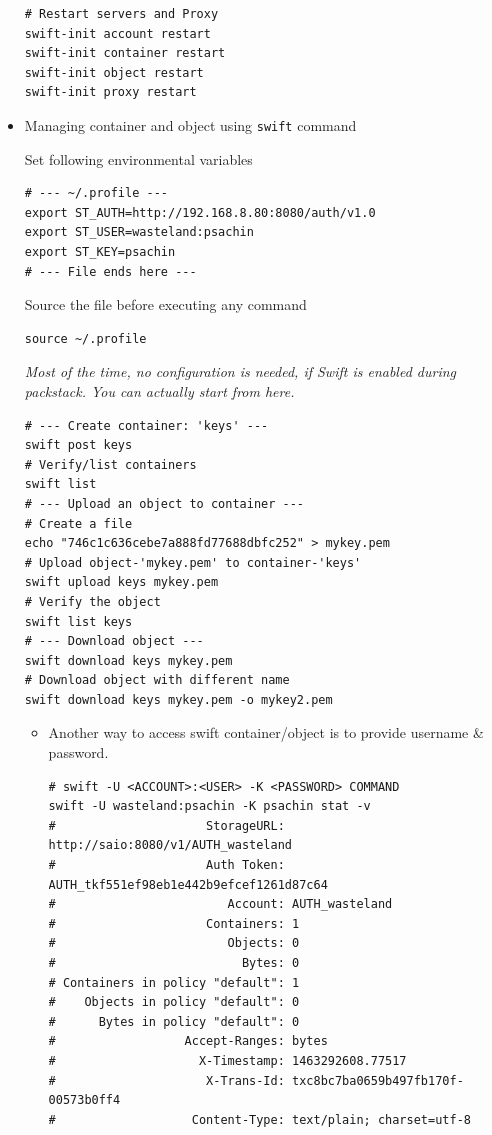 \documentclass{article}
\begin{document}
\begin{itemize}
\begin{verbatim}
# Restart servers and Proxy
swift-init account restart
swift-init container restart
swift-init object restart
swift-init proxy restart
\end{verbatim}
\item Managing container and object using \texttt{swift} command

Set following environmental variables
\begin{verbatim}
# --- ~/.profile ---
export ST_AUTH=http://192.168.8.80:8080/auth/v1.0
export ST_USER=wasteland:psachin
export ST_KEY=psachin
# --- File ends here ---
\end{verbatim}

Source the file before executing any command
\begin{verbatim}
source ~/.profile
\end{verbatim}

\emph{Most of the time, no configuration is needed, if Swift is
enabled during packstack. You can actually start from here.}
\begin{verbatim}
# --- Create container: 'keys' ---
swift post keys
# Verify/list containers
swift list
# --- Upload an object to container ---
# Create a file
echo "746c1c636cebe7a888fd77688dbfc252" > mykey.pem
# Upload object-'mykey.pem' to container-'keys'
swift upload keys mykey.pem
# Verify the object
swift list keys
# --- Download object ---
swift download keys mykey.pem
# Download object with different name
swift download keys mykey.pem -o mykey2.pem
\end{verbatim}

\begin{itemize}
\item Another way to access swift container/object is to provide
username \& password.
\begin{verbatim}
# swift -U <ACCOUNT>:<USER> -K <PASSWORD> COMMAND
swift -U wasteland:psachin -K psachin stat -v
#                     StorageURL: http://saio:8080/v1/AUTH_wasteland
#                     Auth Token: AUTH_tkf551ef98eb1e442b9efcef1261d87c64
#                        Account: AUTH_wasteland
#                     Containers: 1
#                        Objects: 0
#                          Bytes: 0
# Containers in policy "default": 1
#    Objects in policy "default": 0
#      Bytes in policy "default": 0
#                  Accept-Ranges: bytes
#                    X-Timestamp: 1463292608.77517
#                     X-Trans-Id: txc8bc7ba0659b497fb170f-00573b0ff4
#                   Content-Type: text/plain; charset=utf-8


\end{verbatim}
\end{itemize}
\end{itemize}
\end{document}
